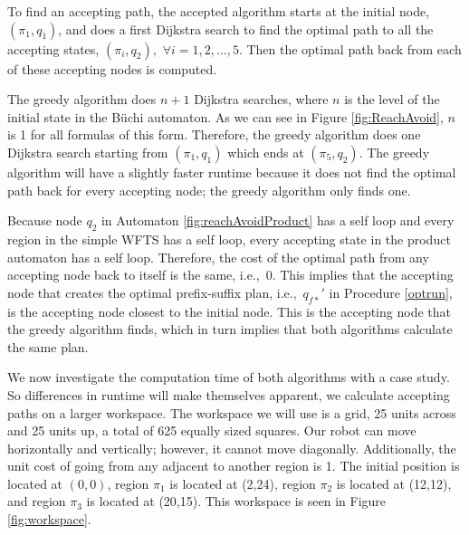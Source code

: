To find an accepting path, the accepted algorithm starts at the initial node, $(\pi_1,q_1)$, and does a first Dijkstra search to find the optimal path to all the accepting states, $(\pi_i,q_2),$ $\forall i = 1,2,\dots,5$. Then the optimal path back from each of these accepting nodes is computed.  
 
The greedy algorithm does $n+1$ Dijkstra searches, where $n$ is the level of the initial state in the B\"{u}chi automaton. As we can see in Figure \ref{fig:ReachAvoid}, $n$ is 1 for all formulas of this form. Therefore, the greedy algorithm does one Dijkstra search starting from $(\pi_1,q_1)$ which ends at $(\pi_5,q_2)$. The greedy algorithm will have a slightly faster runtime because it does not find the optimal path back for every accepting node; the greedy algorithm only finds one. 

Because node $q_2$ in Automaton \ref{fig:reachAvoidProduct} has a self loop and every region in the simple WFTS has a self loop, every accepting state in the product automaton has a self loop. Therefore, the cost of the optimal path from any accepting node back to itself is the same, i.e.,\ 0. This implies that the accepting node that creates the optimal prefix-suffix plan, i.e.,\ $q_{f*}'$ in Procedure \ref{optrun}, is the accepting node closest to the initial node. This is the accepting node that the greedy algorithm finds, which in turn implies that both algorithms calculate the same plan. 


We now investigate the computation time of both algorithms with a case study. So differences in runtime will make themselves apparent, we calculate accepting paths on a larger workspace. The workspace we will use is a grid, 25 units across and 25 units up, a total of 625 equally sized squares. Our robot can move horizontally and vertically; however, it cannot move diagonally. Additionally, the unit cost of going from any adjacent to another region is 1. The initial position is located at $(0,0)$, region $\pi_1$ is located at (2,24), region $\pi_2$ is located at (12,12), and region $\pi_3$ is located at (20,15). This workspace is seen in Figure \ref{fig:workspace}.

